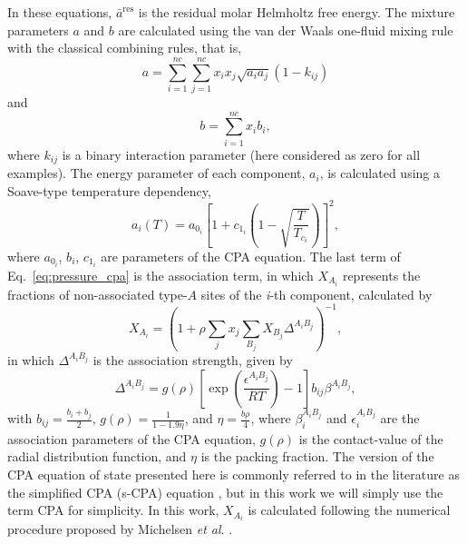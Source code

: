 \documentclass[preprint,12pt,3p]{elsarticle}
\begin{document}
In these equations, $\bar{a}^\text{res}$ is the residual molar Helmholtz free energy.
The mixture parameters $a$ and $b$ are calculated using the van der Waals one-fluid mixing rule with the classical combining rules, that is,
\begin{equation}
a = \sum_{i=1}^{nc} \sum_{j=1}^{nc} x_{i}x_{j}\sqrt{a_{i}a_{j}}(1-k_{ij})
\end{equation}
and
\begin{equation}
b = \sum_{i=1}^{nc}x_{i}b_{i},
\end{equation}
where $k_{ij}$ is a binary interaction parameter (here considered as zero for all examples).
The energy parameter of each component, $a_{i}$, is calculated using a Soave-type temperature dependency,
\begin{equation}
a_{i}(T) = a_{0_{i}}\left[1+c_{1_{i}}\left(1-\sqrt{\frac{T}{T_{c_{i}}}}\right)\right]^2,
\end{equation}
where $a_{0_{i}}$, $b_{i}$, $c_{1_{i}}$ are parameters of the CPA equation.
The last term of Eq.~\ref{eq:pressure_cpa} is the association term, in which $X_{A_{i}}$ represents the fractions of non-associated type-$A$ sites of the \textit{i}-th component, calculated by
\begin{equation} \label{eq:frac_nb}
X_{A_{i}} = \left(1+\rho \sum_{j}x_{j} \sum_{B_{j}} X_{B_{j}} \Delta^{A_{i}B_{j}}\right)^{-1},
\end{equation}
in which $\Delta^{A_{i}B_{j}}$ is the association strength, given by
\begin{equation} \label{eq:delta_cpa}
\Delta^{A_{i}B_{j}} = g(\rho)\left[\exp\left(\frac{\epsilon^{A_{i}B_{j}}}{RT}\right)-1\right]b_{ij}\beta^{A_{i}B_{j}},
\end{equation}
with $b_{ij} = \frac{b_{i}+b_{j}}{2}$, $g(\rho) = \frac{1}{1-1.9\eta}$, and $\eta = \frac{b\rho}{4}$,
where $\beta_{i}^{A_{i}B_{j}}$ and $\epsilon_{i}^{A_{i}B_{j}}$ are the association parameters of the CPA equation, $g(\rho)$ is the contact-value of the radial distribution function, and $\eta$ is the packing fraction.
The version of the CPA equation of state presented here is commonly referred to in the literature as the simplified CPA (s-CPA) equation \citep{kontogeorgis1999multicomponent}, but in this work we will simply use the term CPA for simplicity.
In this work, $X_{A_{i}}$ is calculated following the numerical procedure proposed by Michelsen \textit{et al}.
 \citep{michelsen2006robust}.
\end{document}
